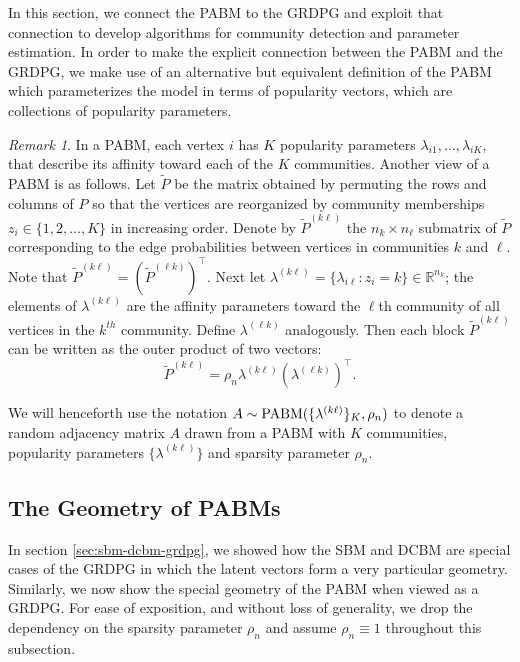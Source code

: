 \documentclass[
  11pt,
]{article}
\theoremstyle{definition}
\theoremstyle{definition}
\theoremstyle{definition}
\theoremstyle{definition}
\theoremstyle{remark}
\newtheorem*{remark}{Remark}
\begin{document}
In this section, we connect the PABM to the GRDPG and exploit that connection to develop algorithms for community detection and parameter estimation.
In order to make the explicit connection between the PABM and the GRDPG, we make use of an alternative but equivalent definition of the PABM which parameterizes the model in terms of popularity vectors, which are collections of popularity parameters.

\begin{remark}
\label{rem:pabm_view2}
In a PABM, each vertex $i$ has $K$ popularity parameters $\lambda_{i1}, \dots, \lambda_{iK}$, that describe its affinity toward each of the $K$ communities. 
Another view of a PABM is as follows.
Let $\tilde{P}$ be the matrix obtained by permuting the rows and columns of $P$ so that the vertices are reorganized by community memberships $z_i \in \{1,2,\dots,K\}$ in increasing order. 
Denote by $\tilde{P}^{(k \ell)}$ the $n_k \times n_{\ell}$ submatrix of $\tilde{P}$ corresponding to the edge probabilities between vertices in communities $k$ and $\ell$. 
Note that $\tilde{P}^{(k \ell)} = (\tilde{P}^{(\ell k)})^\top$. 
Next let $\lambda^{(k \ell)} = \{\lambda_{i \ell} \colon z_i = k\} \in \mathbb{R}^{n_k}$; the elements of $\lambda^{(k \ell)}$ are the affinity parameters toward the $\ell$th community of all vertices in the $k^{th}$ community. 
Define $\lambda^{(\ell k)}$ analogously. 
Then each block $\tilde{P}^{(k \ell)}$ can be written as the outer product of two vectors:
\begin{equation} \label{eq:pabm}
  \tilde{P}^{(k \ell)} = \rho_n \lambda^{(k \ell)} (\lambda^{(\ell k)})^{\top}.
\end{equation} 

We will henceforth use the notation \(A \sim \mathrm{PABM}(\{\lambda^{(k \ell)}\}_K, \rho_n)\) to denote a random adjacency matrix \(A\) drawn from a PABM with $K$ communities, popularity parameters \(\{\lambda^{(k \ell)}\}\) and sparsity parameter $\rho_n$.
\end{remark}

\hypertarget{the-geometry-of-pabms}{%
\subsection{The Geometry of PABMs}\label{the-geometry-of-pabms}}

In section \ref{sec:sbm-dcbm-grdpg}, we showed how the SBM and DCBM are special cases of the GRDPG in which the latent vectors form a very particular geometry.
Similarly, we now show the special geometry of the PABM when viewed as a GRDPG.
For ease of exposition, and without loss of generality, we drop the dependency on the sparsity parameter \(\rho_n\) and assume \(\rho_n \equiv 1\) throughout this subsection.
\end{document}
